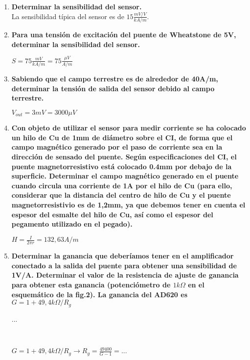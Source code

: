 \begin{enumerate}
    \item \textbf{Determinar la sensibilidad del sensor.} \\
    La sensibilidad típica del sensor es de $15 \frac{mV/V}{kA/m}$.
    \item \textbf{Para una tensión de excitación del puente de Wheatstone de 5V, determinar la sensibilidad del sensor.} \\
    \centerline{$S = 75 \frac{mV}{kA/m} = 75 \frac{\mu V}{A/m}$}
    \item \textbf{Sabiendo que el campo terrestre es de alrededor de 40A/m, determinar la tensión de salida del sensor debido al campo terrestre.} \\
    \centerline{$V_{out} = 3 mV = 3000 \mu V$}
    \item \textbf{Con objeto de utilizar el sensor para medir corriente se ha colocado un hilo de Cu de 1mm de diámetro sobre el CI, de forma que el campo magnético generado por el paso de corriente sea en la dirección de sensado del puente. Según especificaciones del CI, el puente magnetorresistivo está colocado 0.4mm por debajo de la superficie. Determinar el campo magnético generado en el puente cuando circula una corriente de 1A por el hilo de Cu (para ello, considerar que la distancia del centro de hilo de Cu y el puente magnetorresistivio es de 1,2mm, ya que debemos tener en cuenta el espesor del esmalte del hilo de Cu, así como el espesor del pegamento utilizado en el pegado).} \\
    \centerline{$H = \frac{I}{2 \pi r} = 132,63 A/m$}
    \item \textbf{Determinar la ganancia que deberíamos tener en el amplificador conectado a la salida del puente para obtener una sensibilidad de 1V/A. Determinar el valor de la resistencia de ajuste de ganancia para obtener esta ganancia (potenciómetro de $1k\Omega$ en el esquemático de la fig.2). La ganancia del AD620 es $G=1+49,4k\Omega/R_g$} \\
    \centerline{ ... } \\
    \centerline{$G = 1+49,4k\Omega/R_g \to R_g = \frac{49400}{G-1} = ...$}
\end{enumerate}
